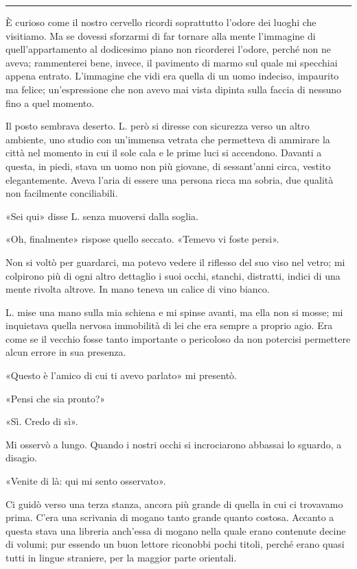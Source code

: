 \documentclass[a4paper,11pt,oneside,openright,final]{memoir}
\begin{document}
\plainbreak{1}

È curioso come il nostro cervello ricordi soprattutto l'odore dei luoghi che
visitiamo. Ma se dovessi sforzarmi di far tornare alla mente l'immagine di
quell'appartamento al dodicesimo piano non ricorderei l'odore, perché non ne
aveva; rammenterei bene, invece, il pavimento di marmo sul quale mi specchiai
appena entrato. L'immagine che vidi era quella di un uomo indeciso, impaurito ma
felice; un'espressione che non avevo mai vista dipinta sulla faccia di nessuno
fino a quel momento.

Il posto sembrava deserto. L. però si diresse con sicurezza verso un altro
ambiente, uno studio con un'immensa vetrata che permetteva di ammirare la
città nel momento in cui il sole cala e le prime luci si accendono. Davanti a
questa, in piedi, stava un uomo non più giovane, di sessant'anni circa, vestito
elegantemente. Aveva l'aria di essere una persona ricca ma sobria, due qualità
non facilmente conciliabili.

«Sei qui» disse L. senza muoversi dalla soglia.

«Oh, finalmente» rispose quello seccato. «Temevo vi foste persi».

Non si voltò per guardarci, ma potevo vedere il riflesso del suo viso nel vetro;
mi colpirono più di ogni altro dettaglio i suoi occhi, stanchi, distratti,
indici di una mente rivolta altrove. In mano teneva un calice di vino bianco.

L. mise una mano sulla mia schiena e mi spinse avanti, ma ella non si mosse; mi
inquietava quella nervosa immobilità di lei che era sempre a proprio agio. Era
come se il vecchio fosse tanto importante o pericoloso da non potercisi
permettere alcun errore in sua presenza.

«Questo è l'amico di cui ti avevo parlato» mi presentò.

«Pensi che sia pronto?»

«Sì. Credo di sì».

Mi osservò a lungo. Quando i nostri occhi si incrociarono abbassai lo sguardo,
a disagio.

«Venite di là: qui mi sento osservato».

Ci guidò verso una terza stanza, ancora più grande di quella in cui ci trovavamo
prima. C'era una scrivania di mogano tanto grande quanto costosa. Accanto a
questa stava una libreria anch'essa di mogano nella quale erano contenute decine
di volumi; pur essendo un buon lettore riconobbi pochi titoli, perché erano
quasi tutti in lingue straniere, per la maggior parte orientali.
\end{document}
